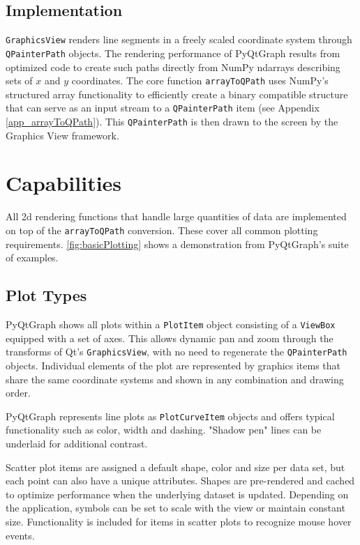 \documentclass[journal]{vgtc}                %
\begin{document}
\subsection{Implementation}
\texttt{GraphicsView} renders line segments in a freely scaled coordinate system through \texttt{QPainterPath} objects. The rendering performance of PyQtGraph results from optimized code to create such paths directly from NumPy ndarrays describing sets of $x$ and $y$ coordinates. The core function \texttt{arrayToQPath} uses NumPy's structured array functionality to efficiently create a binary compatible structure that can serve as an input stream to a \texttt{QPainterPath} item (see Appendix \autoref{app_arrayToQPath}). This \texttt{QPainterPath} is then drawn to the screen by the Graphics View framework.

\section{Capabilities}

All 2d rendering functions that handle large quantities of data are implemented on top of the \texttt{arrayToQPath} conversion. These cover all common plotting requirements. \autoref{fig:basicPlotting} shows a demonstration from PyQtGraph's suite of examples.

\subsection{Plot Types}
\makeBasicPlottingFig

PyQtGraph shows all plots within a \texttt{PlotItem} object consisting of a \texttt{ViewBox} equipped with a set of axes. This allows dynamic pan and zoom through the transforms of Qt's \texttt{GraphicsView}, with no need to regenerate the \texttt{QPainterPath} objects. Individual elements of the plot are represented by graphics items that share the same coordinate systems and shown in any combination and drawing order. 

PyQtGraph represents line plots as \texttt{PlotCurveItem} objects and offers typical functionality such as color, width and dashing. "Shadow pen" lines can be underlaid for additional contrast. 

Scatter plot items are assigned a default shape, color and size per data set, but each point can also have a unique attributes. Shapes are pre-rendered and cached to optimize performance when the underlying dataset is updated. Depending on the application, symbols can be set to scale with the view or maintain constant size.  Functionality is included for items in scatter plots to recognize mouse hover events.
\end{document}

